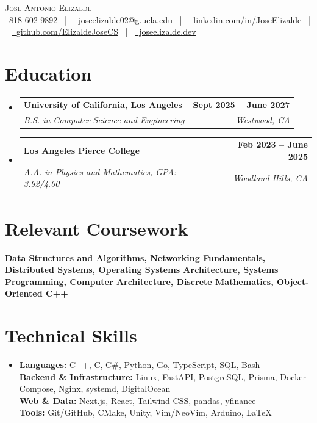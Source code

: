 \documentclass[letterpaper,11pt]{article}
\makeatletter
\newcommand{\resumeSubheading}[4]{
  \vspace{-4pt}\item
  \begin{tabular*}{1.0\textwidth}[t]{l@{\extracolsep{\fill}}r}
    \textbf{#1} & \textbf{\small #2} \\
    \textit{\small #3} & \textit{\small #4} \\
  \end{tabular*}\vspace{-7pt}
}
\newcommand{\resumeSubHeadingListStart}{\begin{itemize}[leftmargin=0in, label={}]}
\newcommand{\resumeSubHeadingListEnd}{\end{itemize}}
\makeatother
\begin{document}
\begin{center}
    {\huge \scshape Jose Antonio Elizalde} \\ \vspace{0pt}
    \small
    \faPhone\ 818-602-9892 ~|~
    \href{mailto:joseelizalde02@g.ucla.edu}{\faEnvelope\ joseelizalde02@g.ucla.edu} ~|~
    \href{https://www.linkedin.com/in/jose-elizalde-184781342/}{\faLinkedin\ linkedin.com/in/JoseElizalde} ~|~
    \href{https://github.com/ElizaldeJoseCS}{\faGithub\ github.com/ElizaldeJoseCS} ~|~
    \href{https://joseelizalde.dev}{\faGlobe\ joseelizalde.dev}
\end{center}

\section{Education}
\resumeSubHeadingListStart
  \resumeSubheading
    {University of California, Los Angeles}{Sept 2025 -- June 2027}
    {B.S. in Computer Science and Engineering}{Westwood, CA}
  \resumeSubheading
    {Los Angeles Pierce College}{Feb 2023 -- June 2025}
    {A.A. in Physics and Mathematics, GPA: 3.92/4.00}{Woodland Hills, CA}
\resumeSubHeadingListEnd

\section{Relevant Coursework}
\small{
  \textbf{Data Structures and Algorithms, Networking Fundamentals, Distributed Systems, Operating Systems Architecture, Systems Programming, Computer Architecture, Discrete Mathematics, Object-Oriented C++}
}

\section{Technical Skills}
\begin{itemize}[leftmargin=0.15in, label={}]
  \item \small{
    \textbf{Languages:} C++, C, C\#, Python, Go, TypeScript, SQL, Bash \\
    \textbf{Backend \& Infrastructure:} Linux, FastAPI, PostgreSQL, Prisma, Docker Compose, Nginx, systemd, DigitalOcean \\
    \textbf{Web \& Data:} Next.js, React, Tailwind CSS, pandas, yfinance \\
    \textbf{Tools:} Git/GitHub, CMake, Unity, Vim/NeoVim, Arduino, LaTeX \\
  }
\end{itemize}
\end{document}
